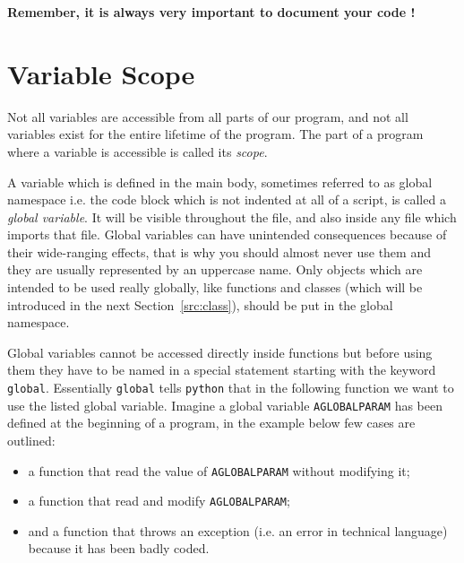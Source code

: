 \textbf{Remember, it is always very important to document your code !}

\section{Variable Scope}
\label{sec:var_scope}

Not all variables are accessible from all parts of our program, and not all variables exist for the entire lifetime of the program. The part of a program where a variable is accessible is called its \emph{scope}.

A variable which is defined in the main body, sometimes referred to as global namespace i.e. the code block which is not indented at all of a script, is called a \emph{global variable}. It will be visible throughout the file, and also inside any file which imports that file. Global variables can have unintended consequences because of their wide-ranging effects, that is why you should almost never use them and they are usually represented by an uppercase name. Only objects which are intended to be used really globally, like functions and classes (which will be introduced in the next Section~\ref{src:class}), should be put in the global namespace.

Global variables cannot be accessed directly inside functions but before using them they have to be named in a special statement starting with the keyword \texttt{global}. Essentially \texttt{global} tells \texttt{python} that in the following function we want to use the listed global variable.
Imagine a global variable \texttt{AGLOBALPARAM} has been defined at the beginning of a program, 
in the example below few cases are outlined:
\begin {itemize}
\tightlist
\item a function that read the value of \texttt{AGLOBALPARAM} without modifying it;
\item a function that read and modify \texttt{AGLOBALPARAM};
\item and a function that throws an exception (i.e. an error in technical language) because it has been badly coded.
\end{itemize}


